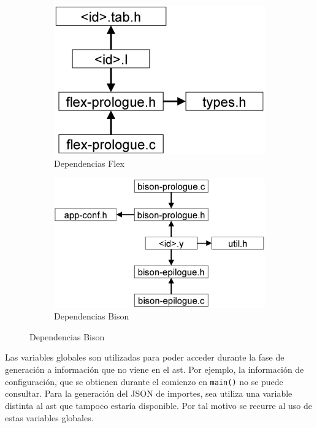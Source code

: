 \begin{figure}
    \centering
    \begin{subfigure}[b]{0.40\textwidth}
        \centering
        \includegraphics[width=\textwidth]{imaxes/h-implementacion/relaciones-flex}
        \caption{Dependencias Flex}
        \label{fig:dependencia-flex}
    \end{subfigure}
    \hfill
    \begin{subfigure}[b]{0.59\textwidth}
        \centering
        \includegraphics[width=\textwidth]{imaxes/h-implementacion/relaciones-bison}
        \caption{Dependencias Bison}
        \label{fig:dependencia-bison}
    \end{subfigure}
\end{figure}

Las variables globales son utilizadas para poder acceder durante la fase de generación a información que no viene en el \acrshort{ast}. Por ejemplo, la información de configuración, que se obtienen durante el comienzo en \verb|main()| no se puede consultar. Para la generación del JSON de importes, sea utiliza una variable distinta al \acrshort{ast} que tampoco estaría disponible. Por tal motivo se recurre al uso de estas variables globales.


